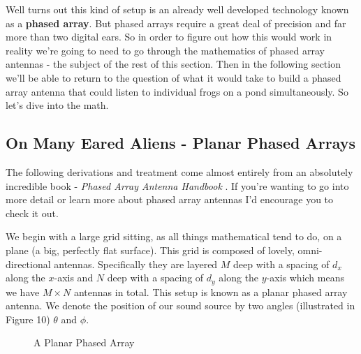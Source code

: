 \documentclass[10pt,a4paper]{article}
\begin{document}
Well turns out this kind of setup is an already well developed technology known as a \textbf{phased array}. But phased arrays require a great deal of precision and far more than two digital ears. So in order to figure out how this would work in reality we're going to need to go through the mathematics of phased array antennas - the subject of the rest of this section. Then in the following section we'll be able to return to the question of what it would take to build a phased array antenna that could listen to individual frogs on a pond simultaneously. So let's dive into the math. 

\subsection{On Many Eared Aliens - Planar Phased Arrays}
The following derivations and treatment come almost entirely from an absolutely incredible book - \textit{Phased Array Antenna Handbook} \cite{phasedhandbook}. If you're wanting to go into more detail or learn more about phased array antennas I'd encourage you to check it out. 

We begin with a large grid sitting, as all things mathematical tend to do, on a plane (a big, perfectly flat surface). This grid is composed of lovely, omni-directional antennas. Specifically they are layered $M$ deep with a spacing of $d_x$ along the $x$-axis  and $N$ deep with a spacing of $d_y$ along the $y$-axis which means we have $M\times N$ antennas in total. This setup is known as a planar phased array antenna. We denote the position of our sound source by two angles (illustrated in Figure 10) $\theta$ and $\phi$. 

\begin{figure}[!htb]
\caption{\label{fig:my-label} A Planar Phased Array}
\end{figure}
\end{document}
